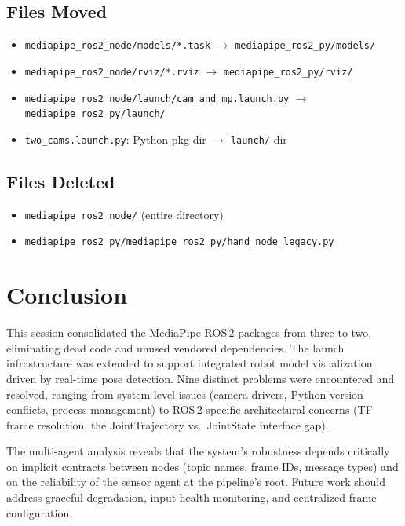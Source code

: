 \documentclass[11pt,a4paper]{article}
\begin{document}
\subsection{Files Moved}
\begin{itemize}
    \item \texttt{mediapipe\_ros2\_node/models/*.task} $\rightarrow$ \texttt{mediapipe\_ros2\_py/models/}
    \item \texttt{mediapipe\_ros2\_node/rviz/*.rviz} $\rightarrow$ \texttt{mediapipe\_ros2\_py/rviz/}
    \item \texttt{mediapipe\_ros2\_node/launch/cam\_and\_mp.launch.py} $\rightarrow$ \texttt{mediapipe\_ros2\_py/launch/}
    \item \texttt{two\_cams.launch.py}: Python pkg dir $\rightarrow$ \texttt{launch/} dir
\end{itemize}

\subsection{Files Deleted}
\begin{itemize}
    \item \texttt{mediapipe\_ros2\_node/} (entire directory)
    \item \texttt{mediapipe\_ros2\_py/mediapipe\_ros2\_py/hand\_node\_legacy.py}
\end{itemize}

\section{Conclusion}

This session consolidated the MediaPipe ROS\,2 packages from three to two, eliminating dead code and unused vendored dependencies. The launch infrastructure was extended to support integrated robot model visualization driven by real-time pose detection. Nine distinct problems were encountered and resolved, ranging from system-level issues (camera drivers, Python version conflicts, process management) to ROS\,2-specific architectural concerns (TF frame resolution, the JointTrajectory vs.\ JointState interface gap).

The multi-agent analysis reveals that the system's robustness depends critically on implicit contracts between nodes (topic names, frame IDs, message types) and on the reliability of the sensor agent at the pipeline's root. Future work should address graceful degradation, input health monitoring, and centralized frame configuration.
\end{document}
